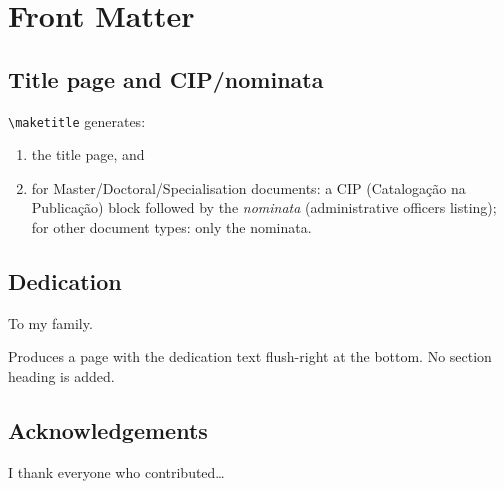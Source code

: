 \documentclass[11pt,a4paper]{article}
\newcommand{\cmd}[1]{\texttt{\textbackslash #1}}
\begin{document}
\section{Front Matter}
\label{sec:frontmatter}

\subsection{Title page and CIP/nominata}

\begin{latex}
\begin{document}
\maketitle
\end{latex}

\cmd{maketitle} generates:
\begin{enumerate}
  \item the title page, and
  \item for Master/Doctoral/Specialisation documents: a CIP
        (Catalogação na Publicação) block followed by the
        \emph{nominata} (administrative officers listing);
        for other document types: only the nominata.
\end{enumerate}

\subsection{Dedication}

\begin{latex}
\begin{dedicatoria}
  To my family.
\end{dedicatoria}
\end{latex}

Produces a page with the dedication text flush-right at the bottom.
No section heading is added.

\subsection{Acknowledgements}

\begin{latex}
\begin{agradecimentos}
  I thank everyone who contributed\ldots
\end{agradecimentos}
\end{latex}
\end{document}
